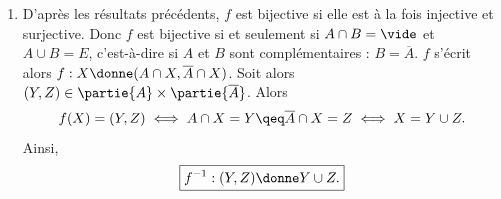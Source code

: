 {{\begin{enumerate}
	\[ X \cap A = Y \qeq X\cap B = Z. \]
	Puisque $x \in Y$, nécessairement, puisque $X\cap A=Y$, $x\in X$. Mais alors $x\in X\cap B$ puisque $x\in B$ : c'est absurde puisque $x\notin Z$. $f$ n'est donc pas surjective.
	\item D'après les résultats précédents, $f$ est bijective si elle est à la fois injective et surjective. Donc $f$ est bijective si et seulement si $A\cap B =\vide$ et $A\cup B = E$, c'est-à-dire si $A$ et $B$ sont complémentaires : $B=\overline{A}$. 
	$f$ s'écrit alors $f:X\donne (A\cap X, \overline{A}\cap X)$.
Soit alors $(Y,Z)\in \partie{A}\times \partie{\overline{A}}$. Alors
\[ f(X) = (Y,Z) \iff A\cap X = Y \qeq \overline{A}\cap X = Z \iff X = Y \cup Z. \]
Ainsi, 
\[ \boxed{ f^{-1} : (Y,Z)\donne Y\cup Z.}\]
	\end{enumerate}}
}

